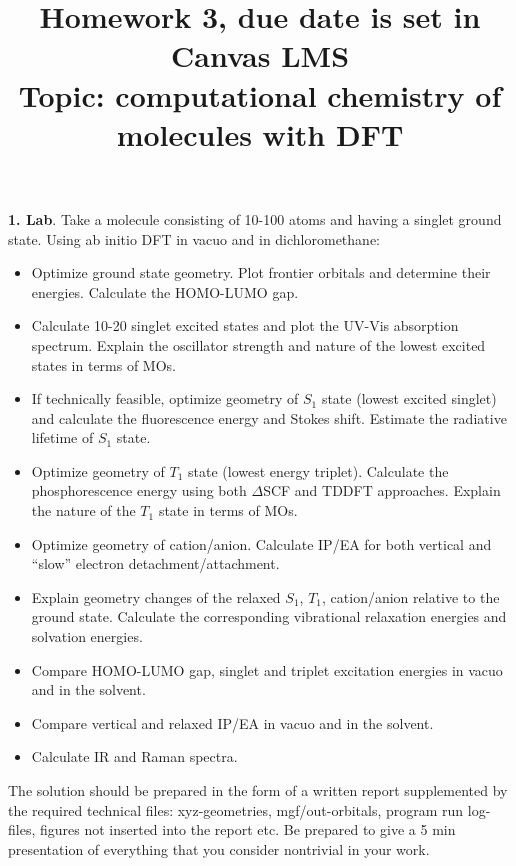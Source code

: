 \documentclass{homework}
\begin{document}
\title{Homework 3, due date is set in Canvas LMS\\ Topic: computational chemistry of molecules with DFT}
\maketitle

\textbf{1. Lab}. Take a molecule consisting of 10-100 atoms and having a singlet ground state. Using ab initio DFT in vacuo and in dichloromethane:
\begin{itemize}\setlength{\itemsep}{0ex}
\item Optimize ground state geometry. Plot frontier orbitals and determine their energies. Calculate the HOMO-LUMO gap.
\item Calculate 10-20 singlet excited states and plot the UV-Vis absorption spectrum. Explain the oscillator strength and nature of the lowest excited states in terms of MOs.
\item If technically feasible, optimize geometry of $S_1$ state (lowest excited singlet) and calculate the fluorescence energy and Stokes shift. Estimate the radiative lifetime of $S_1$ state.
\item Optimize geometry of $T_1$ state (lowest energy triplet). Calculate the phosphorescence energy using both $\Delta$SCF and TDDFT approaches. Explain the nature of the $T_1$ state in terms of MOs. 
\item Optimize geometry of cation/anion. Calculate IP/EA for both vertical and ``slow'' electron detachment/attachment.  
\item Explain geometry changes of the relaxed $S_1$, $T_1$, cation/anion relative to the ground state. Calculate the corresponding vibrational relaxation energies and solvation energies.
\item Compare HOMO-LUMO gap, singlet and triplet excitation energies in vacuo and in the solvent.
\item Compare vertical and relaxed IP/EA in vacuo and in the solvent.
\item Calculate IR and Raman spectra.
\end{itemize}
The solution should be prepared in the form of a written report supplemented by the required technical files: xyz-geometries, mgf/out-orbitals, program run log-files, figures not inserted into the report etc. Be prepared to give a 5 min presentation of everything that you consider nontrivial in your work.

\bigskip\bigskip
\end{document}
